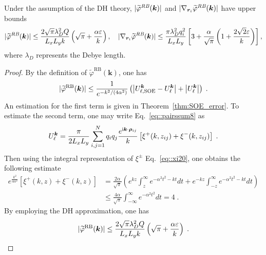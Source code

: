 \begin{lem} 
	Under the assumption of the DH theory, $|\widetilde{\varphi}^{\emph{RB}}(\bm{k})|$ and $|\nabla_{\bm{r}_i}\widetilde{\varphi}^{\emph{RB}}(\bm{k})|$ have upper bounds
	\begin{equation}
		\lvert \widetilde{\varphi}^{\emph{RB}}(\bm{k})\rvert\leq\frac{2\sqrt{\pi}\lambda_D^2 Q}{L_xL_y k}\left(\sqrt{\pi}+\frac{\alpha \varepsilon}{k}\right),
		\quad
		\lvert\nabla_{\bm{r}_{i}} \widetilde{\varphi}^{\emph{RB}}(\bm{k})\rvert\leq  \frac{\pi \lambda_D^2 q_{i}^2}{L_xL_y}\left[3+\frac{\alpha}{\sqrt{\pi}}\left(1+\frac{2\sqrt{2}\varepsilon}{k}\right)\right], 
	\end{equation}
	where $\lambda_{D}$ represents the Debye length.
	\label{lem::upper_bound_phiRB}
\end{lem}
\begin{proof}
	By the definition of $\widetilde{\varphi}^{\text{RB}}(\bm{k})$, one has
	\begin{equation}
		\lvert \widetilde{\varphi}^{\text{RB}}(\bm{k})\rvert\leq \frac{1}{e^{-k^2/(4\alpha^2)}}\left(\left|U_{\ell,\text{SOE}}^{\bm{k}}-U_{\ell}^{\bm{k}}\right|+\left|U_{\ell}^{\bm{k}}\right|\right)\;.
	\end{equation}
	An estimation for the first term is given in Theorem~\ref{thm:SOE_error}. 
	To estimate the second term, one may write Eq.~\eqref{eq::pairssum8} as
	\begin{equation}
		U_{\ell}^{\bm{k}} = \frac{\pi}{2 L_x L_y} \sum_{i, j = 1}^N q_i q_j \frac{e^{\mathrm{i} \boldsymbol{k} \cdot \boldsymbol{\rho}_{ij}}}{k} \left[ \xi^{+} (k, z_{ij})+\xi^{-} (k, z_{ij}) \right]\;.
	\end{equation}
	Then using the integral representation of $\xi^{\pm}$ Eq.~\eqref{eq::xi20}, one obtains the following estimate
	\begin{equation}\label{eq::118}
		\begin{split}
			e^{\frac{k^2}{4 \alpha^2}} \left[\xi^{+} (k, z)+\xi^{-} (k, z)\right] & = \frac{2\alpha}{\sqrt{\pi}} \left(e^{k z} \int_{z}^{\infty} e^{-\alpha^2 t^2 - kt} dt+e^{-k z} \int_{-z}^{\infty} e^{-\alpha^2 t^2 - kt} dt\right)\\
			& \leq \frac{4\alpha}{\sqrt{\pi}} \int_{- \infty}^{\infty} e^{-\alpha^2 t^2} dt= 4\;.
		\end{split}
	\end{equation}
	By employing the DH approximation, one has
	\begin{equation}
		\abs{ \widetilde{\varphi}^{\text{RB}}(\bm{k})}  \leq  \frac{2\sqrt{\pi}\lambda_D^2 Q}{L_xL_y k} \left(\sqrt{\pi} + \frac{\alpha \varepsilon}{k}\right)\;.

\end{equation}
\end{proof}

